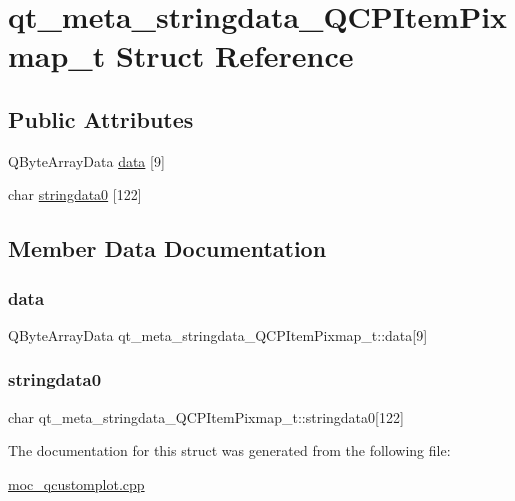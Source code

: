 \hypertarget{structqt__meta__stringdata__QCPItemPixmap__t}{}\section{qt\+\_\+meta\+\_\+stringdata\+\_\+\+Q\+C\+P\+Item\+Pixmap\+\_\+t Struct Reference}
\label{structqt__meta__stringdata__QCPItemPixmap__t}
\subsection*{Public Attributes}
\begin{DoxyCompactItemize}
\item 
Q\+Byte\+Array\+Data \mbox{\hyperlink{structqt__meta__stringdata__QCPItemPixmap__t_aef8aac1ad1d85c743f42d7ad8159bf41}{data}} \mbox{[}9\mbox{]}
\item 
char \mbox{\hyperlink{structqt__meta__stringdata__QCPItemPixmap__t_aea88f01d1b77a98c2d9c3f2c64695c05}{stringdata0}} \mbox{[}122\mbox{]}
\end{DoxyCompactItemize}


\subsection{Member Data Documentation}
\mbox{\label{structqt__meta__stringdata__QCPItemPixmap__t_aef8aac1ad1d85c743f42d7ad8159bf41}} 
\subsubsection{\texorpdfstring{data}{data}}
{\footnotesize\ttfamily Q\+Byte\+Array\+Data qt\+\_\+meta\+\_\+stringdata\+\_\+\+Q\+C\+P\+Item\+Pixmap\+\_\+t\+::data\mbox{[}9\mbox{]}}

\mbox{\label{structqt__meta__stringdata__QCPItemPixmap__t_aea88f01d1b77a98c2d9c3f2c64695c05}} 
\subsubsection{\texorpdfstring{stringdata0}{stringdata0}}
{\footnotesize\ttfamily char qt\+\_\+meta\+\_\+stringdata\+\_\+\+Q\+C\+P\+Item\+Pixmap\+\_\+t\+::stringdata0\mbox{[}122\mbox{]}}



The documentation for this struct was generated from the following file\+:\begin{DoxyCompactItemize}
\item 
\mbox{\hyperlink{moc__qcustomplot_8cpp}{moc\+\_\+qcustomplot.\+cpp}}\end{DoxyCompactItemize}
